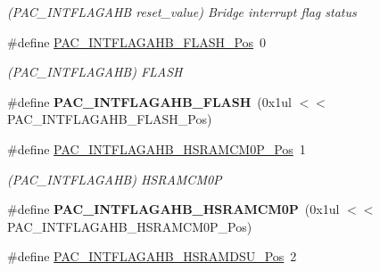 \begin{DoxyCompactItemize}
\begin{DoxyCompactList}\small\item\em (P\+A\+C\+\_\+\+I\+N\+T\+F\+L\+A\+G\+A\+H\+B reset\+\_\+value) Bridge interrupt flag status \end{DoxyCompactList}\item 
\hypertarget{group___s_a_m_l21___p_a_c_ga9473b5c5dff72c63c354118051ce0ee6}{}\#define \hyperlink{group___s_a_m_l21___p_a_c_ga9473b5c5dff72c63c354118051ce0ee6}{P\+A\+C\+\_\+\+I\+N\+T\+F\+L\+A\+G\+A\+H\+B\+\_\+\+F\+L\+A\+S\+H\+\_\+\+Pos}~0\label{group___s_a_m_l21___p_a_c_ga9473b5c5dff72c63c354118051ce0ee6}

\begin{DoxyCompactList}\small\item\em (P\+A\+C\+\_\+\+I\+N\+T\+F\+L\+A\+G\+A\+H\+B) F\+L\+A\+S\+H \end{DoxyCompactList}\item 
\hypertarget{group___s_a_m_l21___p_a_c_ga33ef3ca120b4912799fe6fc6e1d3ace7}{}\#define {\bfseries P\+A\+C\+\_\+\+I\+N\+T\+F\+L\+A\+G\+A\+H\+B\+\_\+\+F\+L\+A\+S\+H}~(0x1ul $<$$<$ P\+A\+C\+\_\+\+I\+N\+T\+F\+L\+A\+G\+A\+H\+B\+\_\+\+F\+L\+A\+S\+H\+\_\+\+Pos)\label{group___s_a_m_l21___p_a_c_ga33ef3ca120b4912799fe6fc6e1d3ace7}

\item 
\hypertarget{group___s_a_m_l21___p_a_c_gaa673b01c43532e7f9502443d0affea2e}{}\#define \hyperlink{group___s_a_m_l21___p_a_c_gaa673b01c43532e7f9502443d0affea2e}{P\+A\+C\+\_\+\+I\+N\+T\+F\+L\+A\+G\+A\+H\+B\+\_\+\+H\+S\+R\+A\+M\+C\+M0\+P\+\_\+\+Pos}~1\label{group___s_a_m_l21___p_a_c_gaa673b01c43532e7f9502443d0affea2e}

\begin{DoxyCompactList}\small\item\em (P\+A\+C\+\_\+\+I\+N\+T\+F\+L\+A\+G\+A\+H\+B) H\+S\+R\+A\+M\+C\+M0\+P \end{DoxyCompactList}\item 
\hypertarget{group___s_a_m_l21___p_a_c_ga8ffad3f068d08b6fc384753581e7891e}{}\#define {\bfseries P\+A\+C\+\_\+\+I\+N\+T\+F\+L\+A\+G\+A\+H\+B\+\_\+\+H\+S\+R\+A\+M\+C\+M0\+P}~(0x1ul $<$$<$ P\+A\+C\+\_\+\+I\+N\+T\+F\+L\+A\+G\+A\+H\+B\+\_\+\+H\+S\+R\+A\+M\+C\+M0\+P\+\_\+\+Pos)\label{group___s_a_m_l21___p_a_c_ga8ffad3f068d08b6fc384753581e7891e}

\item 
\hypertarget{group___s_a_m_l21___p_a_c_ga3a2d64dffe726aec52c10b798e1f39c4}{}\#define \hyperlink{group___s_a_m_l21___p_a_c_ga3a2d64dffe726aec52c10b798e1f39c4}{P\+A\+C\+\_\+\+I\+N\+T\+F\+L\+A\+G\+A\+H\+B\+\_\+\+H\+S\+R\+A\+M\+D\+S\+U\+\_\+\+Pos}~2\label{group___s_a_m_l21___p_a_c_ga3a2d64dffe726aec52c10b798e1f39c4}


\end{DoxyCompactItemize}
